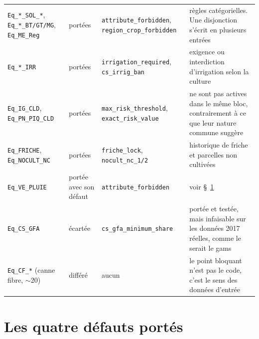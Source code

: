 \begin{table}[H]
\begin{tabularx}{\textwidth}{@{}>{\raggedright\arraybackslash}p{28mm}
                               >{\raggedright\arraybackslash}p{13mm}
                               >{\raggedright\arraybackslash}p{31mm}X@{}}
    \texttt{Eq\_*\_SOL\_*}, \texttt{Eq\_*\_BT/GT/MG}, \texttt{Eq\_ME\_Reg} & portées &
      \texttt{attribute\_forbidden}, \texttt{region\_crop\_forbidden} & règles catégorielles.
      Une disjonction s'écrit en plusieurs entrées \\
    \texttt{Eq\_*\_IRR} & portées &
      \texttt{irrigation\_required}, \texttt{cs\_irrig\_ban} & exigence ou interdiction
      d'irrigation selon la culture \\
    \texttt{Eq\_IG\_CLD}, \texttt{Eq\_PN\_PIQ\_CLD} & portées &
      \texttt{max\_risk\_threshold}, \texttt{exact\_risk\_value} & ne sont pas actives dans le
      même bloc, contrairement à ce que leur nature commune suggère \\
    \texttt{Eq\_FRICHE}, \texttt{Eq\_NOCULT\_NC} & portées &
      \texttt{friche\_lock}, \texttt{nocult\_nc\_1/2} & historique de friche et parcelles non
      cultivées \\
    \texttt{Eq\_VE\_PLUIE} & portée avec son défaut &
      \texttt{attribute\_forbidden} & voir §~\ref{sec:ann-bugs} \\
    \texttt{Eq\_CS\_GFA} & écartée &
      \texttt{cs\_gfa\_minimum\_share} & portée et testée, mais infaisable sur les données
      2017 réelles, comme le serait le \gls{gams} \\
    \texttt{Eq\_CF\_*} (canne fibre, $\sim$20) & différé &
      aucun & le point bloquant n'est pas le code, c'est le sens des données d'entrée \\
    \bottomrule
  \end{tabularx}
\end{table}

\section{Les quatre défauts portés}
\label{sec:ann-bugs}

